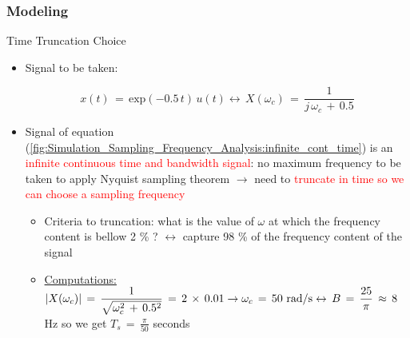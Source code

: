 \subsubsection{Modeling}
\begin{frame}[t,allowframebreaks]{Time Truncation Choice}

\begin{itemize}


\item Signal to be taken:

\begin{equation}
x(t) \, = \, \text{exp}(-0.5 \, t) \, u(t) \leftrightarrow \, X(\omega_c) \, = \, \displaystyle\frac{1}{j \, \omega_c\, + \, 0.5}
\label{fig:Simulation_Sampling_Frequency_Analysis:infinite_cont_time}
\end{equation}

\item Signal of equation (\autoref{fig:Simulation_Sampling_Frequency_Analysis:infinite_cont_time})  is an \textcolor{red}{infinite continuous time and bandwidth signal}: no maximum frequency to be taken to apply Nyquist sampling theorem $\rightarrow$ need to \textcolor{red}{truncate in time so we can choose a sampling frequency}

	\begin{itemize}
	\item Criteria to truncation: what is the value of $\omega$ at which the frequency content is bellow 2 \% ? $\leftrightarrow$ capture 98 \% of the frequency content of the signal
	
	\item \underline{Computations:} $ \displaystyle\left\lvert X(\omega_c) \displaystyle\right\rvert \, = \, \displaystyle\frac{1}{\sqrt{ \omega^2_c\, + \, 0.5^2} } \, = \, 2 \, \times \, 0.01  \rightarrow \omega_c \, = \, 50 \text{ rad/s} \leftrightarrow \, B \, = \,  \displaystyle\frac{25}{\pi} \, \approx \, 8$ Hz so we get $T_s \, = \, \displaystyle\frac{\pi}{50}$ seconds
	\end{itemize}

\end{itemize}

\end{frame}

